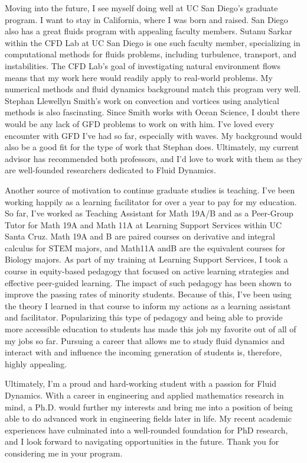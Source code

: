 \documentclass{article}
\begin{document}
Moving into the future, I see myself doing well at UC San Diego's graduate program. I want to stay in California, where I was born and raised. San Diego also has a great fluids program with appealing faculty members. Sutanu Sarkar within the CFD Lab at UC San Diego is one such faculty member, specializing in computational methods for fluids problems, including turbulence, transport, and instabilities. The CFD Lab's goal of investigating natural environment flows means that my work here would readily apply to real-world problems. My numerical methods and fluid dynamics background match this program very well. Stephan Llewellyn Smith's work on convection and vortices using analytical methods is also fascinating. Since Smith works with Ocean Science, I doubt there would be any lack of GFD problems to work on with him. I've loved every encounter with GFD I've had so far, especially with waves. My background would also be a good fit for the type of work that Stephan does. Ultimately, my current advisor has recommended both professors, and I'd love to work with them as they are well-founded researchers dedicated to Fluid Dynamics. 

Another source of motivation to continue graduate studies is teaching. I've been working happily as a learning facilitator for over a year to pay for my education. So far, I've worked as Teaching Assistant for Math 19A/B and as a Peer-Group Tutor for Math 19A and Math 11A at Learning Support Services within UC Santa Cruz. Math 19A and B are paired courses on derivative and integral calculus for STEM majors, and Math11A andB are the equivalent courses for Biology majors. As part of my training at Learning Support Services, I took a course in equity-based pedagogy that focused on active learning strategies and effective peer-guided learning. The impact of such pedagogy has been shown to improve the passing rates of minority students. Because of this, I've been using the theory I learned in that course to inform my actions as a learning assistant and facilitator. Popularizing this type of pedagogy and being able to provide more accessible education to students has made this job my favorite out of all of my jobs so far. Pursuing a career that allows me to study fluid dynamics and interact with and influence the incoming generation of students is, therefore, highly appealing.

Ultimately, I'm a proud and hard-working student with a passion for Fluid Dynamics. With a career in engineering and applied mathematics research in mind, a Ph.D. would further my interests and bring me into a position of being able to do advanced work in engineering fields later in life. My recent academic experiences have culminated into a well-rounded foundation for PhD research, and I look forward to navigating opportunities in the future. Thank you for considering me in your program. 
\end{document}
